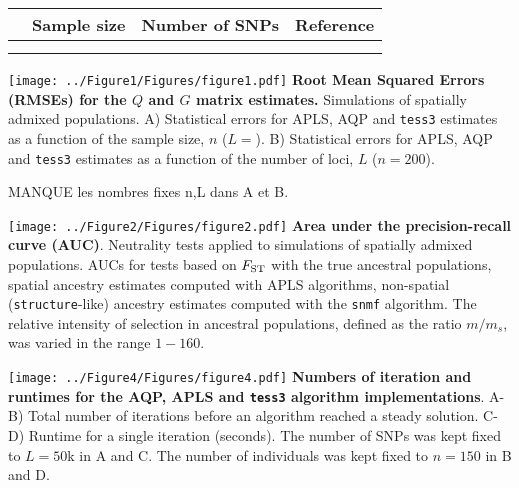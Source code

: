 \clearpage
\newpage
  
\begin{center}
\begin{table}
\caption{{\bf }}
\begin{tabular}{lccc}
\hline
{\bf } &   Sample size & Number of SNPs &  Reference \\
\hline
 &  &   & \\

  &  &   & \\
 \hline
\end{tabular}
\end{table}
\end{center}        




\clearpage 
\newpage



 
\texttt{[image: ../Figure1/Figures/figure1.pdf]}
 {\bf Root Mean Squared Errors (RMSEs) for the $Q$ and $G$ matrix estimates.} Simulations of spatially admixed populations. A) Statistical errors for APLS, AQP and {\tt tess3} estimates as a function of the sample  size, $n$ ($L = $). B) Statistical errors for APLS, AQP and {\tt tess3} estimates as a function of the number of loci, $L$ ($n = 200$).



MANQUE les nombres fixes n,L dans A et B.

\clearpage 
\newpage





 
\texttt{[image: ../Figure2/Figures/figure2.pdf]}
 {\bf Area under the precision-recall curve (AUC)}. Neutrality tests applied to simulations of spatially admixed populations. AUCs for tests based on $F_{\rm ST}$ with the true ancestral populations,  spatial ancestry estimates computed with APLS algorithms, non-spatial ({\tt structure}-like) ancestry estimates computed with the {\tt snmf} algorithm. The relative intensity of selection in ancestral populations, defined as the ratio $m/m_s$, was varied in the range $1-160$.


\clearpage 
\newpage





 
\texttt{[image: ../Figure4/Figures/figure4.pdf]}
 {\bf Numbers of iteration and runtimes for the AQP, APLS and {\tt tess3} algorithm implementations}. A-B)   Total number of iterations before an algorithm reached a steady solution. C-D) Runtime for a single iteration (seconds). The number of SNPs was kept fixed to $L = 50$k in A and C. The number of individuals was kept fixed to $n = 150$ in B and D. 


\clearpage 
\newpage





